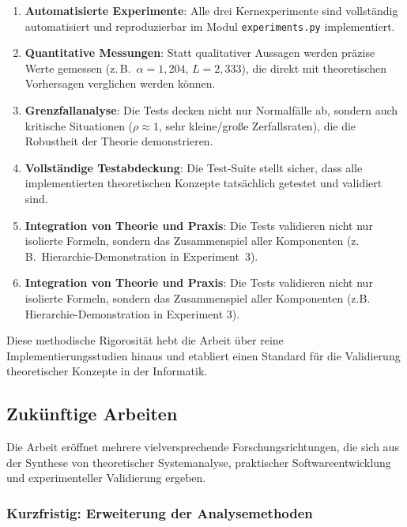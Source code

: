 ﻿\documentclass[a4paper,12pt]{scrreprt}
\theoremstyle{definition}
\begin{document}
\begin{enumerate}
	\item[-] \textbf{Automatisierte Experimente}: Alle drei Kernexperimente
	sind vollständig automatisiert und reproduzierbar im Modul
	\texttt{experiments.py} implementiert.
	
	\item[-] \textbf{Quantitative Messungen}: Statt qualitativer Aussagen
	werden präzise Werte gemessen (z.\,B.\ $\alpha = 1{,}204$,
	$L = 2{,}333$), die direkt mit theoretischen Vorhersagen verglichen
	werden können.
	
	\item[-] \textbf{Grenzfallanalyse}: Die Tests decken nicht nur
	Normalfälle ab, sondern auch kritische Situationen ($\rho \approx 1$,
	sehr kleine/große Zerfallsraten), die die Robustheit der Theorie
	demonstrieren.
	
	\item[-] \textbf{Vollständige Testabdeckung}: Die Test-Suite stellt
	sicher, dass alle implementierten theoretischen Konzepte tatsächlich
	getestet und validiert sind.
	
	\item[-] \textbf{Integration von Theorie und Praxis}: Die Tests
	validieren nicht nur isolierte Formeln, sondern das Zusammenspiel
	aller Komponenten (z.\,B.\ Hierarchie-Demonstration in Experiment~3).
	
	\item[-] \textbf{Integration von Theorie und Praxis}: Die Tests validieren nicht nur isolierte Formeln, sondern das Zusammenspiel aller Komponenten (z.B. Hierarchie-Demonstration in Experiment 3).
\end{enumerate}

Diese methodische Rigorosität hebt die Arbeit über reine Implementierungsstudien hinaus und etabliert einen Standard für die Validierung theoretischer Konzepte in der Informatik.

\subsection{Zukünftige Arbeiten}

Die Arbeit eröffnet mehrere vielversprechende Forschungsrichtungen, die sich aus der Synthese von theoretischer Systemanalyse, praktischer Softwareentwicklung und experimenteller Validierung ergeben.

\subsubsection{Kurzfristig: Erweiterung der Analysemethoden}
\end{document}

